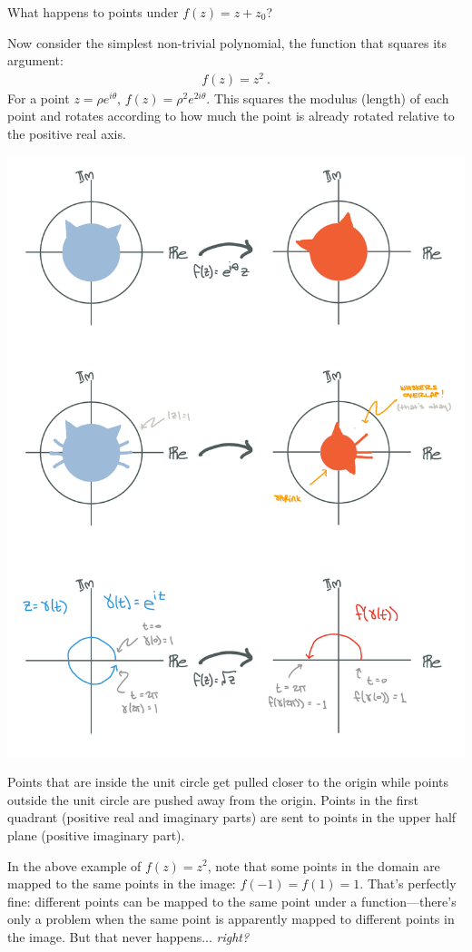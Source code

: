 \begin{exercise}
What happens to points under $f(z) = z+ z_0$?
\end{exercise}


\begin{example}
Now consider the simplest non-trivial polynomial, the function that squares its argument:
\begin{align}
  f(z) =  z^2 \ .
\end{align}
For a point $z = \rho e^{i\theta}$, $f(z)  = \rho^2 e^{2i\theta}$. This squares the modulus (length) of each point and rotates according to how much the point is already rotated relative to the positive real axis.
\begin{center}
\includegraphics[width=.7\textwidth]{figures/Complex_03_sq.pdf}
\end{center}
Points that are inside the unit circle get pulled closer to the origin while points outside the unit circle are pushed away from the origin.  Points in the first quadrant (positive real and imaginary parts) are sent to points in the upper half plane (positive imaginary part).
\end{example}

In the above example of $f(z)= z^2$, note that some points in the domain are mapped to the same points in the image: $f(-1) = f(1) = 1$. That's perfectly fine: different points can be mapped to the same point under a function---there's only a problem when the same point is apparently mapped to different points in the image. But that never happens... \emph{right?}

